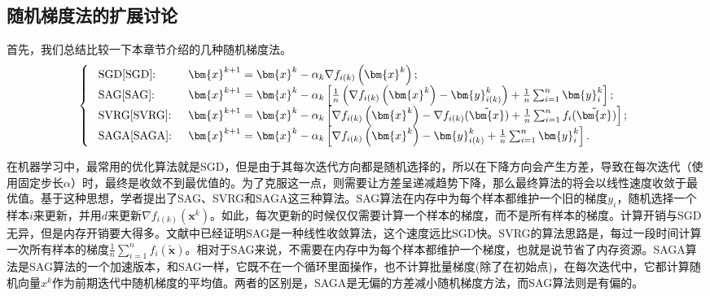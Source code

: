 \subsection{随机梯度法的扩展讨论}
首先，我们总结比较一下本章节介绍的几种随机梯度法。
\begin{equation}
    \left\{\begin{array}{ll}
    \text { SGD\cite{SGD}: } & \bm{x}^{k+1}=\bm{x}^{k}-\alpha_{k} \nabla f_{i(k)}\left(\bm{x}^{k}\right) ;\\
    \text { SAG\cite{SAG}: } & \bm{x}^{k+1}=\bm{x}^{k}-\alpha_{k}\left[\frac{1}{n}\left(\nabla f_{i(k)}\left(\bm{x}^{k}\right)-\bm{y}_{i(k)}^{k}\right)+\frac{1}{n} \sum_{i=1}^{n} \bm{y}_{i}^{k}\right] ;\\
    \text { SVRG\cite{SVRG}: } & \bm{x}^{k+1}=\bm{x}^{k}-\alpha_{k}\left[\nabla f_{i(k)}\left(\bm{x}^{k}\right)-\nabla f_{i(k)}(\tilde{\bm{x}})+\frac{1}{n} \sum_{i=1}^{n} f_{i}(\tilde{\bm{x}})\right] ;\\
    \text { SAGA\cite{SAGA}: } & \bm{x}^{k+1}=\bm{x}^{k}-\alpha_{k}\left[\nabla f_{i(k)}\left(\bm{x}^{k}\right)-\bm{y}_{i(k)}^{k}+\frac{1}{n} \sum_{i=1}^{n} \bm{y}_{i}^{k}\right] .
    \end{array}\right.
\end{equation}
\par 在机器学习中，最常用的优化算法就是SGD\cite{SGD}，但是由于其每次迭代方向都是随机选择的，所以在下降方向会产生方差，导致在每次迭代（使用固定步长$\alpha$）时，最终是收敛不到最优值的。为了克服这一点，则需要让方差呈递减趋势下降，那么最终算法的将会以线性速度收敛于最优值。基于这种思想，学者提出了SAG\cite{SAG}、SVRG\cite{SVRG}和SAGA\cite{SAGA}这三种算法。SAG算法\cite{SAG}在内存中为每个样本都维护一个旧的梯度$y_i$，随机选择一个样本$i$来更新，并用$d$来更新$\nabla f_{i(k)}\left(\bm{x}^{k}\right)$。如此，每次更新的时候仅仅需要计算一个样本的梯度，而不是所有样本的梯度。计算开销与SGD\cite{SGD}无异，但是内存开销要大得多。文献\cite{SAG}中已经证明SAG\cite{SAG}是一种线性收敛算法，这个速度远比SGD\cite{SGD}快。SVRG\cite{SVRG}的算法思路是，每过一段时间计算一次所有样本的梯度$\frac{1}{n} \sum_{i=1}^{n} f_{i}(\tilde{\bm{x}})$。相对于SAG\cite{SAG}来说，不需要在内存中为每个样本都维护一个梯度，也就是说节省了内存资源。SAGA算法\cite{SAGA}是SAG\cite{SAG}算法的一个加速版本，和SAG\cite{SAGA}一样，它既不在一个循环里面操作，也不计算批量梯度(除了在初始点)，在每次迭代中，它都计算随机向量$x^k$作为前期迭代中随机梯度的平均值。两者的区别是，SAGA\cite{SAGA}是无偏的方差减小随机梯度方法，而SAG算法\cite{SAG}则是有偏的。

